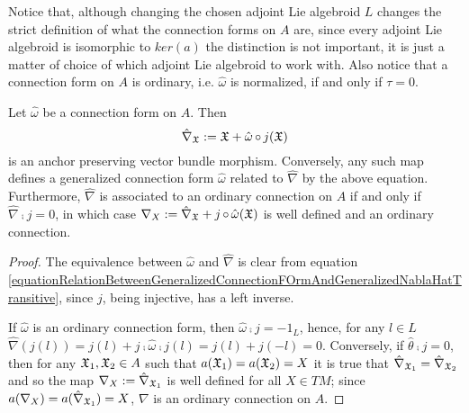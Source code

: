 Notice that, although changing the chosen adjoint Lie algebroid $L$ changes the strict definition of what the connection forms on $A$ are, since every adjoint Lie algebroid is isomorphic to $ker(a)$ the distinction is not important, it is just a matter of choice of which adjoint Lie algebroid to work with. Also notice that a connection form on $A$ is ordinary, i.e. $\hat \omega$ is normalized, if and only if $\tau = 0$.

\begin{proposition}
Let $\hat \omega$ be a connection form on $A$. Then 
\begin{equation}\label{equationRelationBetweenGeneralizedConnectionFOrmAndGeneralizedNablaHatTransitive}
    \hat \nabla_{\mathfrak{X}} := \mathfrak{X} + \hat \omega \operatorname{\circ} j(\mathfrak{X})
\end{equation}
is an anchor preserving vector bundle morphism. Conversely, any such map defines a generalized connection form $\hat \omega$ related to $\hat \nabla$ by the above equation. Furthermore, $\hat \nabla$ is associated to an ordinary connection on $A$ if and only if $\hat \nabla \comp j = 0$, in which case $\nabla_X := \hat \nabla_{\mathfrak{X}} + j \operatorname{\circ} \hat \omega(\mathfrak{X})$ is well defined and an ordinary connection.
\end{proposition}

\begin{proof}
The equivalence between $\hat \omega$ and $\hat \nabla$ is clear from equation \eqref{equationRelationBetweenGeneralizedConnectionFOrmAndGeneralizedNablaHatTransitive}, since $j$, being injective, has a left inverse.

If $\hat \omega$ is an ordinary connection form, then $\hat \omega \comp j = -1_L$, hence, for any $l \in L$ $\hat \nabla(j(l)) = j(l) + j \comp \hat \omega \comp j(l) = j(l) + j(-l) = 0$. Conversely, if $\hat \theta \comp j= 0$, then for any $\mathfrak{X}_1, \mathfrak{X}_2 \in A$ such that $a(\mathfrak{X}_1) = a(\mathfrak{X}_2) = X$ it is true that $\hat \nabla_{\mathfrak{X}_1} = \hat \nabla_{\mathfrak{X}_2}$ and so the map $\nabla_X := \hat \nabla_{\mathfrak{X}_1}$ is well defined for all $X \in TM$; since $a(\nabla_X) = a(\hat \nabla_{\mathfrak{X}_1}) = X$, $\nabla$ is an ordinary connection on $A$.
\end{proof}


